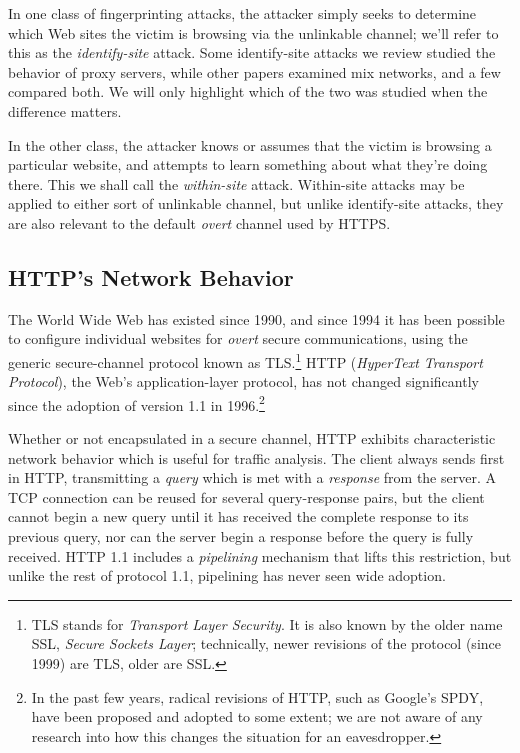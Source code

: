 \documentclass{zarticle}
\begin{document}
In one class of fingerprinting attacks, the attacker simply seeks to
determine which Web sites the victim is browsing via the unlinkable
channel; we'll refer to this as the \emph{identify-site} attack.  Some
identify-site attacks we review studied the behavior of proxy servers,
while other papers examined mix networks, and a few compared both.  We
will only highlight which of the two was studied when the difference
matters.

In the other class, the attacker knows or assumes that the victim is
browsing a particular website, and attempts to learn something about
what they're doing there.  This we shall call the \emph{within-site}
attack.  Within-site attacks may be applied to either sort of
unlinkable channel, but unlike identify-site attacks, they are also
relevant to the default \emph{overt} channel used by HTTPS.

\subsection{HTTP's Network Behavior}

The World Wide Web has existed since 1990, and since 1994 it has been
possible to configure individual websites for \emph{overt} secure
communications, using the generic secure-channel protocol known as
TLS.\footnote{TLS stands for \emph{Transport Layer Security}. It is
  also known by the older name SSL, \emph{Secure Sockets Layer};
  technically, newer revisions of the protocol (since 1999) are TLS,
  older are SSL.}  HTTP (\emph{HyperText Transport Protocol}), the
Web's application-layer protocol, has not changed significantly since
the adoption of version 1.1 in 1996.\footnote{In the past few years,
  radical revisions of HTTP, such as Google's SPDY, have been proposed
  and adopted to some extent; we are not aware of any research into
  how this changes the situation for an eavesdropper.}

Whether or not encapsulated in a secure channel, HTTP exhibits
characteristic network behavior which is useful for traffic analysis.
The client always sends first in HTTP, transmitting a \emph{query}
which is met with a \emph{response} from the server.  A TCP connection
can be reused for several query-response pairs, but the client cannot
begin a new query until it has received the complete response to its
previous query, nor can the server begin a response before the query
is fully received.  HTTP 1.1 includes a \emph{pipelining} mechanism
that lifts this restriction, but unlike the rest of protocol 1.1,
pipelining has never seen wide adoption.
\end{document}

